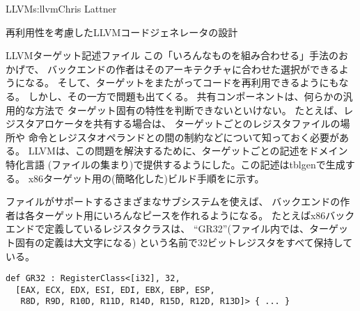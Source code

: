 \begin{aosachapter}{LLVM}{s:llvm}{Chris Lattner}
\begin{aosasect1}{再利用性を考慮したLLVMコードジェネレータの設計}
\begin{aosasect2}{LLVMターゲット記述ファイル}
この「いろんなものを組み合わせる」手法のおかげで、
バックエンドの作者はそのアーキテクチャに合わせた選択ができるようになる。
そして、ターゲットをまたがってコードを再利用できるようにもなる。
しかし、その一方で問題も出てくる。
共有コンポーネントは、何らかの汎用的な方法で
ターゲット固有の特性を判断できないといけない。
たとえば、レジスタアロケータを共有する場合は、
ターゲットごとのレジスタファイルの場所や
命令とレジスタオペランドとの間の制約などについて知っておく必要がある。
LLVMは、この問題を解決するために、ターゲットごとの記述をドメイン特化言語
(ファイルの集まり)で提供するようにした。この記述はtblgenで生成する。
x86ターゲット用の(簡略化した)ビルド手順をに示す。


ファイルがサポートするさまざまなサブシステムを使えば、
バックエンドの作者は各ターゲット用にいろんなピースを作れるようになる。
たとえばx86バックエンドで定義しているレジスタクラスは、
``GR32''(ファイル内では、ターゲット固有の定義は大文字になる)
という名前で32ビットレジスタをすべて保持している。

\begin{verbatim}
def GR32 : RegisterClass<[i32], 32,
  [EAX, ECX, EDX, ESI, EDI, EBX, EBP, ESP,
   R8D, R9D, R10D, R11D, R14D, R15D, R12D, R13D]> { ... }
\end{verbatim}


\end{aosasect2}
\end{aosasect1}
\end{aosachapter}
